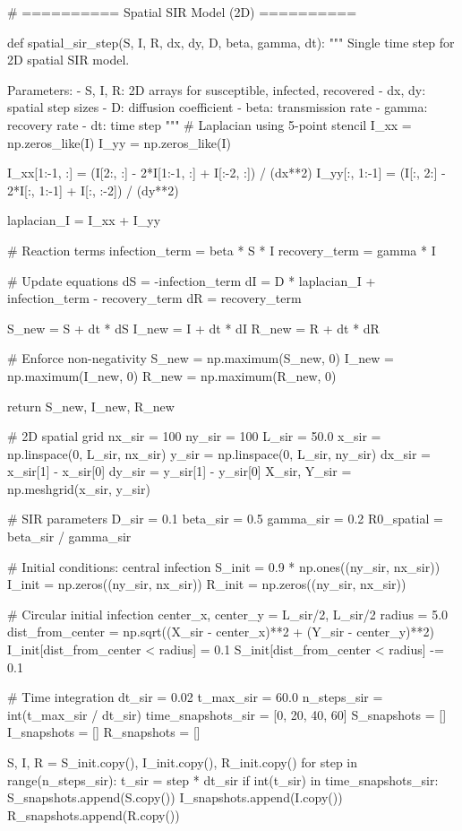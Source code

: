 \documentclass[a4paper, 11pt]{article}
\begin{document}
\begin{pycode}
# ========== Spatial SIR Model (2D) ==========

def spatial_sir_step(S, I, R, dx, dy, D, beta, gamma, dt):
    """
    Single time step for 2D spatial SIR model.

    Parameters:
    - S, I, R: 2D arrays for susceptible, infected, recovered
    - dx, dy: spatial step sizes
    - D: diffusion coefficient
    - beta: transmission rate
    - gamma: recovery rate
    - dt: time step
    """
    # Laplacian using 5-point stencil
    I_xx = np.zeros_like(I)
    I_yy = np.zeros_like(I)

    I_xx[1:-1, :] = (I[2:, :] - 2*I[1:-1, :] + I[:-2, :]) / (dx**2)
    I_yy[:, 1:-1] = (I[:, 2:] - 2*I[:, 1:-1] + I[:, :-2]) / (dy**2)

    laplacian_I = I_xx + I_yy

    # Reaction terms
    infection_term = beta * S * I
    recovery_term = gamma * I

    # Update equations
    dS = -infection_term
    dI = D * laplacian_I + infection_term - recovery_term
    dR = recovery_term

    S_new = S + dt * dS
    I_new = I + dt * dI
    R_new = R + dt * dR

    # Enforce non-negativity
    S_new = np.maximum(S_new, 0)
    I_new = np.maximum(I_new, 0)
    R_new = np.maximum(R_new, 0)

    return S_new, I_new, R_new

# 2D spatial grid
nx_sir = 100
ny_sir = 100
L_sir = 50.0
x_sir = np.linspace(0, L_sir, nx_sir)
y_sir = np.linspace(0, L_sir, ny_sir)
dx_sir = x_sir[1] - x_sir[0]
dy_sir = y_sir[1] - y_sir[0]
X_sir, Y_sir = np.meshgrid(x_sir, y_sir)

# SIR parameters
D_sir = 0.1
beta_sir = 0.5
gamma_sir = 0.2
R0_spatial = beta_sir / gamma_sir

# Initial conditions: central infection
S_init = 0.9 * np.ones((ny_sir, nx_sir))
I_init = np.zeros((ny_sir, nx_sir))
R_init = np.zeros((ny_sir, nx_sir))

# Circular initial infection
center_x, center_y = L_sir/2, L_sir/2
radius = 5.0
dist_from_center = np.sqrt((X_sir - center_x)**2 + (Y_sir - center_y)**2)
I_init[dist_from_center < radius] = 0.1
S_init[dist_from_center < radius] -= 0.1

# Time integration
dt_sir = 0.02
t_max_sir = 60.0
n_steps_sir = int(t_max_sir / dt_sir)
time_snapshots_sir = [0, 20, 40, 60]
S_snapshots = []
I_snapshots = []
R_snapshots = []

S, I, R = S_init.copy(), I_init.copy(), R_init.copy()
for step in range(n_steps_sir):
    t_sir = step * dt_sir
    if int(t_sir) in time_snapshots_sir:
        S_snapshots.append(S.copy())
        I_snapshots.append(I.copy())
        R_snapshots.append(R.copy())


\end{pycode}
\end{document}
